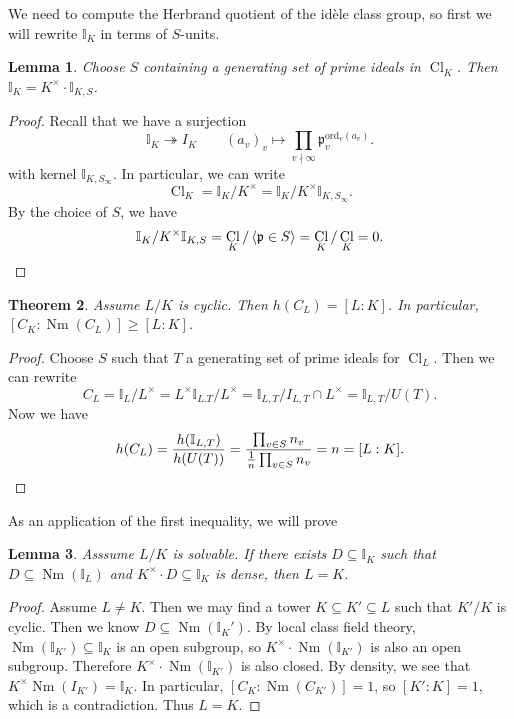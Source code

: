 \documentclass[leqno, openany]{memoir}
\newtheorem{thm}{Theorem}[section]
\newtheorem{lem}[thm]{Lemma}
\theoremstyle{definition}
\theoremstyle{remark}
\theoremstyle{plain}
\theoremstyle{definition}
\theoremstyle{remark}
\newcommand{\I}{\mathbb{I}}
\newcommand{\mf}[1]{\mathfrak{#1}}
\newcommand{\mr}[1]{\mathrm{#1}}
\DeclareMathOperator{\Cl}{Cl}
\DeclareMathOperator{\Nm}{Nm}
\begin{document}
We need to compute the Herbrand quotient of the id\`ele class group, so first we will rewrite $\I_K$ in terms of $S$-units.

\begin{lem}
    Choose $S$ containing a generating set of prime ideals in $\Cl_K$. Then $\I_K = K^{\times} \cdot \I_{K, S}$.
\end{lem}

\begin{proof}
    Recall that we have a surjection 
    \[ \I_K \twoheadrightarrow I_K \qquad {(a_v)}_v \mapsto \prod_{v \nmid \infty} \mf{p}_v^{\mr{ord}_v(a_v)}. \]
    with kernel $\I_{K, S_{\infty}}$. In particular, we can write
    \[ \Cl_K = \I_K / K^{\times} = \I_K / K^{\times} \I_{K, S_{\infty}}. \]
    By the choice of $S$, we have
    \[ \I_K/K^{\times} \I_{K,S} = \Cl_K/\ev{\mf{p} \in S} = \Cl_K / \Cl_K = 0. \qedhere \]
\end{proof}

\begin{thm}
    Assume $L/K$ is cyclic. Then $h(C_L) = [L:K]$. In particular, $[C_K: \Nm(C_L)] \geq [L:K]$.
\end{thm}

\begin{proof}
    Choose $S$ such that $T$ a generating set of prime ideals for $\Cl_L$. Then we can rewrite
    \[ C_L = \I_L/L^{\times} = L^{\times} \I_{L.T}/L^{\times} = \I_{L,T}/I_{L,T} \cap L^{\times} = \I_{L,T}/U(T). \]
    Now we have 
    \[ h(C_L) = \frac{h(\I_{L, T})}{h(U(T))} = \frac{\prod_{v \in S} n_v}{\frac{1}{n} \prod_{v \in S} n_v} = n = [L:K]. \qedhere \]
\end{proof}

As an application of the first inequality, we will prove

\begin{lem}
    Asssume $L/K$ is solvable. If there exists $D \subseteq \I_K$ such that $D \subseteq \Nm(\I_L)$ and $K^{\times} \cdot D \subseteq \I_K$ is dense, then $L = K$.
\end{lem}

\begin{proof}
    Assume $L \neq K$. Then we may find a tower $K \subseteq K' \subseteq L$ such that $K'/K$ is cyclic. Then we know $D \subseteq \Nm(\I_K')$. By local class field theory, $\Nm(\I_{K'}) \subseteq \I_K$ is an open subgroup, so $K^{\times} \cdot \Nm(\I_{K'})$ is also an open subgroup. Therefore $K^{\times} \cdot \Nm(\I_{K'})$ is also closed. By density, we see that $K^{\times} \Nm(I_{K'}) = \I_K$. In particular, $[C_K : \Nm(C_{K'})] = 1$, so $[K':K] = 1$, which is a contradiction. Thus $L = K$.
\end{proof}
\end{document}
